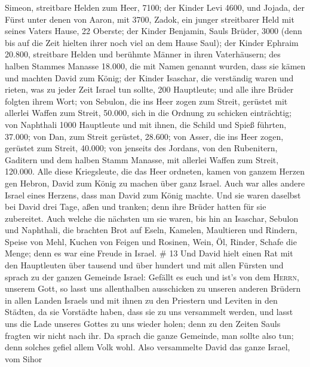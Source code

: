 Simeon, streitbare Helden zum Heer, 7100;  der Kinder
Levi 4600,  und Jojada, der Fürst unter denen von Aaron,
mit 3700,  Zadok, ein junger streitbarer Held mit seines
Vaters Hause, 22 Oberste;  der Kinder Benjamin, Sauls
Brüder, 3000 (denn bis auf die Zeit hielten ihrer noch viel an dem Hause
Saul);  der Kinder Ephraim 20.800, streitbare Helden und
berühmte Männer in ihren Vaterhäusern;  des halben
Stammes Manasse 18.000, die mit Namen genannt wurden, dass sie kämen und
machten David zum König;  der Kinder Isaschar, die
verständig waren und rieten, was zu jeder Zeit Israel tun sollte, 200
Hauptleute; und alle ihre Brüder folgten ihrem Wort;  von
Sebulon, die ins Heer zogen zum Streit, gerüstet mit allerlei Waffen zum
Streit, 50.000, sich in die Ordnung zu schicken einträchtig;
 von Naphthali 1000 Hauptleute und mit ihnen, die Schild
und Spieß führten, 37.000;  von Dan, zum Streit gerüstet,
28.600;  von Asser, die ins Heer zogen, gerüstet zum
Streit, 40.000;  von jenseits des Jordans, von den
Rubenitern, Gaditern und dem halben Stamm Manasse, mit allerlei Waffen
zum Streit, 120.000.  Alle diese Kriegsleute, die das
Heer ordneten, kamen von ganzem Herzen gen Hebron, David zum König zu
machen über ganz Israel. Auch war alles andere Israel eines Herzens,
dass man David zum König machte.  Und sie waren daselbst
bei David drei Tage, aßen und tranken; denn ihre Brüder hatten für sie
zubereitet.  Auch welche die nächsten um sie waren, bis
hin an Isaschar, Sebulon und Naphthali, die brachten Brot auf Eseln,
Kamelen, Maultieren und Rindern, Speise von Mehl, Kuchen von Feigen und
Rosinen, Wein, Öl, Rinder, Schafe die Menge; denn es war eine Freude in
Israel. \# 13  Und David hielt einen Rat mit den
Hauptleuten über tausend und über hundert und mit allen Fürsten
 und sprach zu der ganzen Gemeinde Israel: Gefällt es euch
und ist's von dem \textsc{Herrn}, unserem Gott, so lasst uns
allenthalben ausschicken zu unseren anderen Brüdern in allen Landen
Israels und mit ihnen zu den Priestern und Leviten in den Städten, da
sie Vorstädte haben, dass sie zu uns versammelt werden, 
und lasst uns die Lade unseres Gottes zu uns wieder holen; denn zu den
Zeiten Sauls fragten wir nicht nach ihr.  Da sprach die
ganze Gemeinde, man sollte also tun; denn solches gefiel allem Volk
wohl.  Also versammelte David das ganze Israel, vom Sihor
